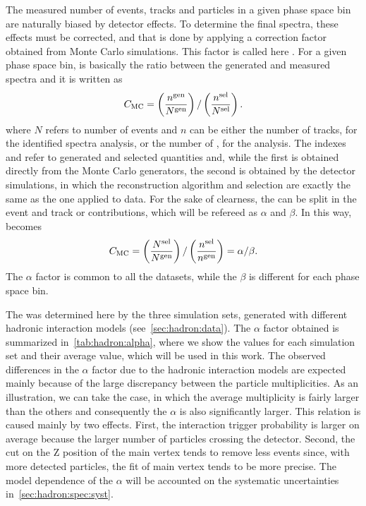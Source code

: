 The measured number of events, tracks and \vzeros
particles in a given phase space bin are naturally biased by
detector effects. To determine the final spectra,
these effects must be corrected, and that
is done by applying a correction factor obtained
from Monte Carlo simulations. This factor is called here \cmc.
For a given phase space bin, \cmc is basically the ratio
between the generated and measured spectra and it
is written as
\begin{equation}
  \mbox{$C_\text{MC}$} = \left( \frac{n^\text{gen}}{N^\text{gen}} \right) / \left( \frac{n^\text{sel}}{N^\text{sel}} \right).
  \label{eq:hadron:correction:cmc}
\end{equation}
where $N$ refers to number of events and $n$ can be either the number of
tracks, for the identified spectra analysis, or the number
of \vzeros, for the \vzero analysis.
The indexes \gen and \sel refer to generated and selected quantities and,
while the first is obtained directly from the Monte Carlo generators,
the second is obtained by the detector simulations, in which the
reconstruction algorithm and selection are exactly the same
as the one applied to data.
For the sake of clearness, the \cmc can be split in the
event and track or \vzero contributions, which will be refereed as
$\alpha$ and $\beta$. In this way, \cmc becomes
\begin{equation}
  \mbox{$C_\text{MC}$} = \left( \frac{N^\text{sel}}{N^\text{gen}} \right) / \left( \frac{n^\text{sel}}{n^\text{gen}} \right) = \alpha / \beta.
  \label{eq:hadron:correction:cmc:2}
\end{equation}
The $\alpha$ factor is common to all the datasets,
while the $\beta$ is different for each phase space bin. 

The \cmc was determined here by 
the three simulation sets, generated with different hadronic
interaction models (see~\cref{sec:hadron:data}).
The $\alpha$ factor obtained is summarized
in~\cref{tab:hadron:alpha}, where we show the values for each simulation
set and their average value, which will be used in this work. 
The observed differences in the $\alpha$ factor due
to the hadronic interaction models are expected mainly
because of the large discrepancy between the particle
multiplicities. As an illustration, we can take the \DPMJetLong
case, in which the average multiplicity is
fairly larger than the others and consequently the
$\alpha$ is also significantly larger. 
This relation is caused mainly by two effects. First,
the interaction trigger probability is larger on average
because the larger number of particles crossing the detector.
Second, the cut on the Z position of the main vertex
tends to remove less events since, with more detected particles,
the fit of main vertex tends to be more precise.
The model dependence of the $\alpha$ will be accounted
on the systematic uncertainties in~\cref{sec:hadron:spec:syst}.

